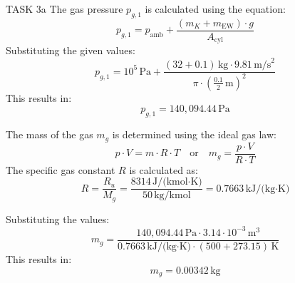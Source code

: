 TASK 3a  
The gas pressure \( p_{g,1} \) is calculated using the equation:  
\[
p_{g,1} = p_{\text{amb}} + \frac{(m_K + m_{\text{EW}}) \cdot g}{A_{\text{cyl}}}
\]  
Substituting the given values:  
\[
p_{g,1} = 10^5 \, \text{Pa} + \frac{(32 + 0.1) \, \text{kg} \cdot 9.81 \, \text{m/s}^2}{\pi \cdot \left(\frac{0.1}{2} \, \text{m}\right)^2}
\]  
This results in:  
\[
p_{g,1} = 140,094.44 \, \text{Pa}
\]  

The mass of the gas \( m_g \) is determined using the ideal gas law:  
\[
p \cdot V = m \cdot R \cdot T \quad \text{or} \quad m_g = \frac{p \cdot V}{R \cdot T}
\]  
The specific gas constant \( R \) is calculated as:  
\[
R = \frac{R_u}{M_g} = \frac{8314 \, \text{J/(kmol·K)}}{50 \, \text{kg/kmol}} = 0.7663 \, \text{kJ/(kg·K)}
\]  

Substituting the values:  
\[
m_g = \frac{140,094.44 \, \text{Pa} \cdot 3.14 \cdot 10^{-3} \, \text{m}^3}{0.7663 \, \text{kJ/(kg·K)} \cdot (500 + 273.15) \, \text{K}}
\]  
This results in:  
\[
m_g = 0.00342 \, \text{kg}
\]